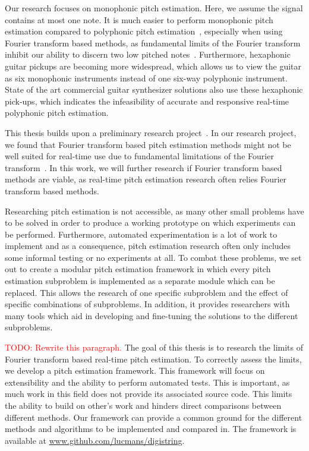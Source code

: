 \documentclass[a4paper,10pt,twocolumn]{article}
\begin{document}
Our research focuses on monophonic pitch estimation. Here, we assume the signal contains at most one note. It is much easier to perform monophonic pitch estimation compared to polyphonic pitch estimation~\cite{monotopoly}, especially when using Fourier transform based methods, as fundamental limits of the Fourier transform inhibit our ability to discern two low pitched notes~\cite{nopoly}. Furthermore, hexaphonic guitar pickups are becoming more widespread, which allows us to view the guitar as six monophonic instruments instead of one six-way polyphonic instrument. State of the art commercial guitar synthesizer solutions also use these hexaphonic pick-ups, which indicates the infeasibility of accurate and responsive real-time polyphonic pitch estimation.

This thesis builds upon a preliminary research project~\cite{ik}. In our research project, we found that Fourier transform based pitch estimation methods might not be well suited for real-time use due to fundamental limitations of the Fourier transform~\cite{fourierlimit}. In this work, we will further research if Fourier transform based methods are viable, as real-time pitch estimation research often relies Fourier transform based methods.

Researching pitch estimation is not accessible, as many other small problems have to be solved in order to produce a working prototype on which experiments can be performed. Furthermore, automated experimentation is a lot of work to implement and as a consequence, pitch estimation research often only includes some informal testing or no experiments at all. To combat these problems, we set out to create a modular pitch estimation framework in which every pitch estimation subproblem is implemented as a separate module which can be replaced. This allows the research of one specific subproblem and the effect of specific combinations of subproblems. In addition, it provides researchers with many tools which aid in developing and fine-tuning the solutions to the different subproblems.

\textcolor{red}{TODO: Rewrite this paragraph.} The goal of this thesis is to research the limits of Fourier transform based real-time pitch estimation. To correctly assess the limits, we develop a pitch estimation framework. This framework will focus on extensibility and the ability to perform automated tests. This is important, as much work in this field does not provide its associated source code. This limits the ability to build on other's work and hinders direct comparisons between different methods. Our framework can provide a common ground for the different methods and algorithms to be implemented and compared in. The framework is available at \url{www.github.com/lucmans/digistring}.
\end{document}
